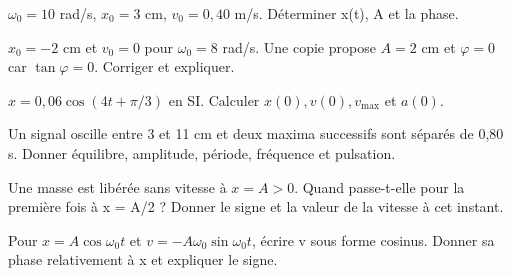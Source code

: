 \begin{questions}
\item $\omega_0=10$ rad/s, $x_0=3$ cm, $v_0=0{,}40$ m/s. Déterminer x(t), A et la phase.
\end{questions}

\begin{questions}
\item $x_0=-2$ cm et $v_0=0$ pour $\omega_0=8$ rad/s. Une copie propose $A=2$ cm et $\varphi=0$ car $\tan\varphi=0$. Corriger et expliquer.
\end{questions}

\begin{questions}
\item $x=0{,}06\cos(4t+\pi/3)$ en SI. Calculer $x(0),v(0),v_{\max}$ et $a(0)$.
\end{questions}



\begin{questions}
\item Un signal oscille entre 3 et 11 cm et deux maxima successifs sont séparés de 0,80 s. Donner équilibre, amplitude, période, fréquence et pulsation.
\end{questions}

\begin{questions}
\item Une masse est libérée sans vitesse à $x=A>0$. Quand passe-t-elle pour la première fois à x = A/2 ? Donner le signe et la valeur de la vitesse à cet instant.
\end{questions}

\begin{questions}
\item Pour $x=A\cos\omega_0t$ et $v=-A\omega_0\sin\omega_0t$, écrire v sous forme cosinus. Donner sa phase relativement à x et expliquer le signe.
\end{questions}



